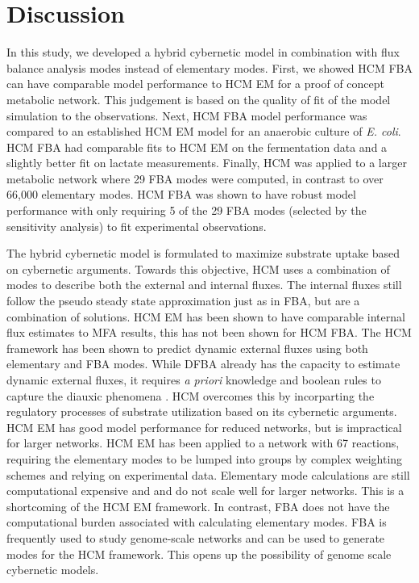 \documentclass[10pt,twocolumn,twoside,final]{IEEEtran}
\begin{document}
\section{Discussion}
In this study, we developed a hybrid cybernetic model in combination with flux balance analysis modes instead of elementary modes. 
First, we showed HCM FBA can have comparable model performance to HCM EM for a proof of concept metabolic network. 
This judgement is based on the quality of fit of the model simulation to the observations. 
Next, HCM FBA model performance was compared to an established HCM EM model\cite{2008_kim_varner_ramkrishna_BiotechProg} for an anaerobic culture of \textit{E. coli}. 
HCM FBA had comparable fits to HCM EM on the fermentation data and a slightly better fit on lactate measurements. 
Finally, HCM was applied to a larger metabolic network where 29 FBA modes were computed, in contrast to over 66,000 elementary modes.  
HCM FBA was shown to have robust model performance with only requiring 5 of the 29 FBA modes (selected by the sensitivity analysis) to fit experimental observations.

The hybrid cybernetic model is formulated to maximize substrate uptake based on cybernetic arguments. 
Towards this objective, HCM uses a combination of modes to describe both the external and internal fluxes. 
The internal fluxes still follow the pseudo steady state approximation just as in FBA, but are a combination of solutions.
HCM EM has been shown to have comparable internal flux estimates to MFA results\cite{2008_kim_varner_ramkrishna_BiotechProg}, this has not been shown for HCM FBA.
The HCM framework has been shown to predict dynamic external fluxes using both elementary and FBA modes.
While DFBA already has the capacity to estimate dynamic external fluxes, it requires \textit{a priori} knowledge and boolean rules to capture the diauxic phenomena \cite{1994_varma_palsson_ApplEnvMicro,2002_Mahadevan_BiophysJ,2001_covert_schilling_palsson}.  
HCM overcomes this by incorparting the regulatory processes of substrate utilization based on its cybernetic arguments. 
HCM EM has good model performance for reduced networks, but is impractical for larger networks.
HCM EM has been applied to a network with 67 reactions, requiring the elementary modes to be lumped into groups by complex weighting schemes and relying on experimental data\cite{2010_song_ramkrishna}.
Elementary mode calculations are still computational expensive and and do not scale well for larger networks\cite{2004_lee_varner_ko_ieee}. 
This is a shortcoming of the HCM EM framework.
In contrast, FBA does not have the computational burden associated with calculating elementary modes.  
FBA is frequently used to study genome-scale networks\cite{2010_orth_NatBiotech} and can be used to generate modes for the HCM framework. 
This opens up the possibility of genome scale cybernetic models.
\end{document}
